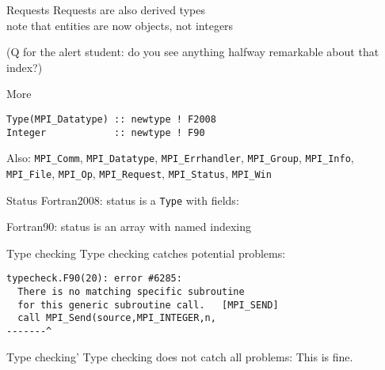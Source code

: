 \begin{numberedframe}{Requests}
  Requests are also derived types\\
  note that  entities are now objects, not integers


  (Q for the alert student: do you see anything halfway
  remarkable about that index?)
\end{numberedframe}

\begin{numberedframe}{More}
\begin{lstlisting}
Type(MPI_Datatype) :: newtype ! F2008
Integer            :: newtype ! F90
\end{lstlisting}

Also:
  \lstinline{MPI_Comm}, \lstinline{MPI_Datatype},
  \lstinline{MPI_Errhandler}, \lstinline{MPI_Group},
  \lstinline{MPI_Info}, \lstinline{MPI_File}, \lstinline{MPI_Op},
  \lstinline{MPI_Request}, \lstinline{MPI_Status}, \lstinline{MPI_Win}
\end{numberedframe}

\begin{numberedframe}{Status}
  Fortran2008: status is a \lstinline{Type} with fields:

  Fortran90: status is an array with named indexing
\end{numberedframe}

\begin{numberedframe}{Type checking}
  Type checking catches potential problems:
\begin{verbatim}
typecheck.F90(20): error #6285: 
  There is no matching specific subroutine
  for this generic subroutine call.   [MPI_SEND]
  call MPI_Send(source,MPI_INTEGER,n,
-------^
\end{verbatim}
\end{numberedframe}

\begin{numberedframe}{Type checking'}
  Type checking does not catch all problems:
  This is fine.
\end{numberedframe}

\lstset{language=C}
